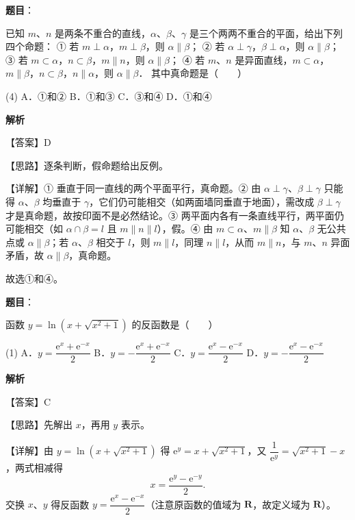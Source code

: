 \begin{answer}

\textbf{题目}：

已知 $m$、$n$ 是两条不重合的直线，$\alpha$、$\beta$、$\gamma$ 是三个两两不重合的平面，给出下列四个命题：
① 若 $m \perp \alpha$，$m \perp \beta$，则 $\alpha \parallel \beta$；
② 若 $\alpha \perp \gamma$，$\beta \perp \alpha$，则 $\alpha \parallel \beta$；
③ 若 $m \subset \alpha$，$n \subset \beta$，$m \parallel n$，则 $\alpha \parallel \beta$；
④ 若 $m$、$n$ 是异面直线，$m \subset \alpha$，$m \parallel \beta$，$n \subset \beta$，$n \parallel \alpha$，则 $\alpha \parallel \beta$．
其中真命题是\mbox{（　　）}

\begin{gkopts}(4)
\task A．①和②
\task B．①和③
\task C．③和④
\task D．①和④
\end{gkopts}

\textbf{解析}

【答案】D

【思路】逐条判断，假命题给出反例。

【详解】① 垂直于同一直线的两个平面平行，真命题。② 由 $\alpha \perp \gamma$、$\beta \perp \gamma$ 只能得 $\alpha$、$\beta$ 均垂直于 $\gamma$，它们仍可能相交（如两面墙同垂直于地面），需改成 $\beta \perp \gamma$ 才是真命题，故按印面不是必然结论。③ 两平面内各有一条直线平行，两平面仍可能相交（如 $\alpha \cap \beta = l$ 且 $m \parallel n \parallel l$），假。④ 由 $m \subset \alpha$、$m \parallel \beta$ 知 $\alpha$、$\beta$ 无公共点或 $\alpha \parallel \beta$；若 $\alpha$、$\beta$ 相交于 $l$，则 $m \parallel l$，同理 $n \parallel l$，从而 $m \parallel n$，与 $m$、$n$ 异面矛盾，故 $\alpha \parallel \beta$，真命题。

故选①和④。


\end{answer}
\begin{answer}

\textbf{题目}：

函数 $y = \ln\left(x + \sqrt{x^2+1}\right)$ 的反函数是\mbox{（　　）}

\begin{gkopts}(1)
\task A．$y = \dfrac{\mathrm{e}^x + \mathrm{e}^{-x}}{2}$
\task B．$y = -\dfrac{\mathrm{e}^x + \mathrm{e}^{-x}}{2}$
\task C．$y = \dfrac{\mathrm{e}^x - \mathrm{e}^{-x}}{2}$
\task D．$y = -\dfrac{\mathrm{e}^x - \mathrm{e}^{-x}}{2}$
\end{gkopts}

\textbf{解析}

【答案】C

【思路】先解出 $x$，再用 $y$ 表示。

【详解】由 $y = \ln\left(x+\sqrt{x^2+1}\right)$ 得 $\mathrm{e}^y = x + \sqrt{x^2+1}$，又 $\dfrac{1}{\mathrm{e}^y} = \sqrt{x^2+1} - x$，两式相减得
\nopagebreak[4]
\[
x = \frac{\mathrm{e}^y - \mathrm{e}^{-y}}{2}.
\]
交换 $x$、$y$ 得反函数 $y = \dfrac{\mathrm{e}^x - \mathrm{e}^{-x}}{2}$（注意原函数的值域为 $\mathbf{R}$，故定义域为 $\mathbf{R}$）。


\end{answer}
